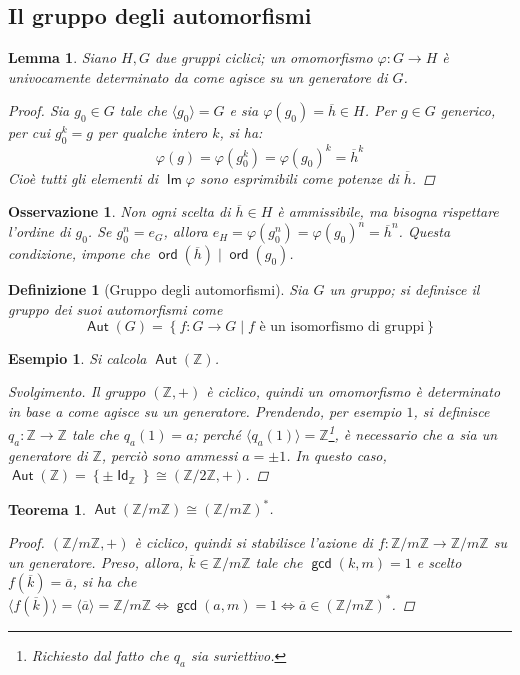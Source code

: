\documentclass[11pt]{scrartcl}
\theoremstyle{style1}
\newtheorem{osservazione}{Osservazione}[section]
\newtheorem{teorema}{Teorema}[section]
\newtheorem{lemma}{Lemma}[teorema]
\newtheorem{definizione}{Definizione}[section]
\newtheorem{esempio}{Esempio}[section]
\newenvironment{svolgimento}{\renewcommand\qedsymbol{$\blacksquare$}\begin{proof}[Svolgimento]}{\end{proof}}
\numberwithin{equation}{subsection}
\renewcommand{\operatorname}[1]{\mathop{\mathrm{\textsf{#1}}}}
\begin{document}
\subsection{Il gruppo degli automorfismi}
\begin{lemma}
	Siano $H,G$ due gruppi ciclici; un omomorfismo $\varphi : G \to H$ \`e univocamente determinato da come agisce su un generatore di $G$.
	\begin{proof}
		Sia $g_0\in G$ tale che $\langle g_0 \rangle = G$ e sia $\varphi (g_0) = \overline{h}\in H$.
		Per $g \in G$ generico, per cui $g_0^k = g$ per qualche intero $k$, si ha:
		\[
		\varphi (g) = \varphi (g_0^k) = \varphi (g_0)^k = \overline{h}^k
		\] 
		Cio\`e tutti gli elementi di $\operatorname{Im} \varphi $ sono esprimibili come potenze di $\overline{h}$.
	\end{proof}
\end{lemma}
\begin{osservazione}
Non ogni scelta di $\overline{h} \in H$ \`e ammissibile, ma bisogna rispettare l'ordine di $g_0$.
Se $g_0^n = e_G$, allora $e_H = \varphi (g_0^n) = \varphi (g_0)^n = \overline{h}^n$. Questa condizione, impone che $\operatorname{ord}(\overline{h})  \mid \operatorname{ord}(g_0) $.
\end{osservazione}
\begin{definizione}
	[Gruppo degli automorfismi]
	Sia $G$ un gruppo; si definisce il gruppo dei suoi automorfismi come
	\[
	\operatorname{Aut} (G) = \left\{ f: G \to G  \mid f \text{ \`e un isomorfismo di gruppi} \right\} 
	\] 
\end{definizione}
\begin{esempio}
	Si calcola $\operatorname{Aut} (\mathbb{Z})$. 
	\begin{svolgimento}
		Il gruppo $(\mathbb{Z},+)$ \`e ciclico, quindi un omomorfismo \`e determinato in base a come agisce su un generatore.
		Prendendo, per esempio $1$, si definisce $q_a :\mathbb{Z}\to \mathbb{Z} $ tale che $ q_a (1 ) = a$; perch\'e $\langle q_a(1) \rangle = \mathbb{Z}$\footnote{Richiesto dal fatto che $q_a$ sia suriettivo.}, \`e necessario che $a$ sia un generatore di $\mathbb{Z}$, perci\`o sono ammessi $a = \pm 1$. 
		In questo caso, $\operatorname{Aut} (\mathbb{Z})=\left\{ \pm \operatorname{Id} _{\mathbb{Z}}  \right\} \cong \left(\mathbb{Z} / 2\mathbb{Z}, +\right) $.
	\end{svolgimento}
\end{esempio}
\begin{teorema}
$\operatorname{Aut} (\mathbb{Z} / m \mathbb{Z}) \cong (\mathbb{Z} / m \mathbb{Z})^*$.
\begin{proof}
	$(\mathbb{Z} / m\mathbb{Z}, + )$ \`e ciclico, quindi si stabilisce l'azione di $f:\mathbb{Z} / m\mathbb{Z}\to \mathbb{Z}/ m\mathbb{Z}$ su un generatore.
	Preso, allora, $\overline{k} \in \mathbb{Z} / m\mathbb{Z} $ tale che $\operatorname{gcd}(k,m) =1$ e scelto $f(\overline{k}) = \overline{a}$, si ha che $\langle f(\overline{k}) \rangle= \langle \overline{a} \rangle= \mathbb{Z} / m\mathbb{Z} \iff \operatorname{gcd}(a,m) =1	\iff \overline{a} \in \left(\mathbb{Z} / m\mathbb{Z}\right) ^* $.
\end{proof}
\end{teorema}
\end{document}
